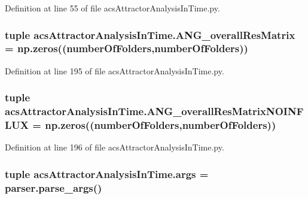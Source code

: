 Definition at line 55 of file acs\-Attractor\-Analysis\-In\-Time.\-py.

\hypertarget{a00123_a15adfffa273548845cea67d8b89f0bb1}{
\subsubsection[{A\-N\-G\-\_\-overall\-Res\-Matrix}]{\setlength{\rightskip}{0pt plus 5cm}tuple acs\-Attractor\-Analysis\-In\-Time.\-A\-N\-G\-\_\-overall\-Res\-Matrix = np.\-zeros(({\bf number\-Of\-Folders},{\bf number\-Of\-Folders}))}}\label{a00123_a15adfffa273548845cea67d8b89f0bb1}


Definition at line 195 of file acs\-Attractor\-Analysis\-In\-Time.\-py.

\hypertarget{a00123_a7b0e67be0cf8de69432bdf56919d9e33}{
\subsubsection[{A\-N\-G\-\_\-overall\-Res\-Matrix\-N\-O\-I\-N\-F\-L\-U\-X}]{\setlength{\rightskip}{0pt plus 5cm}tuple acs\-Attractor\-Analysis\-In\-Time.\-A\-N\-G\-\_\-overall\-Res\-Matrix\-N\-O\-I\-N\-F\-L\-U\-X = np.\-zeros(({\bf number\-Of\-Folders},{\bf number\-Of\-Folders}))}}\label{a00123_a7b0e67be0cf8de69432bdf56919d9e33}


Definition at line 196 of file acs\-Attractor\-Analysis\-In\-Time.\-py.

\hypertarget{a00123_ab6621347b1ac2fe0e436bd2f384af8dc}{
\subsubsection[{args}]{\setlength{\rightskip}{0pt plus 5cm}tuple acs\-Attractor\-Analysis\-In\-Time.\-args = parser.\-parse\-\_\-args()}}\label{a00123_ab6621347b1ac2fe0e436bd2f384af8dc}


